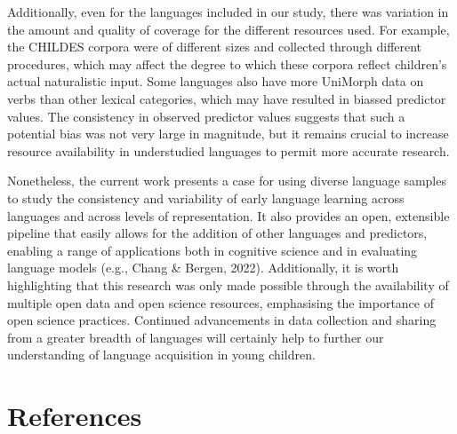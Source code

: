 \documentclass[10pt, letterpaper]{article}
\begin{document}
Additionally, even for the languages included in our study, there was
variation in the amount and quality of coverage for the different
resources used. For example, the CHILDES corpora were of different sizes
and collected through different procedures, which may affect the degree
to which these corpora reflect children's actual naturalistic input.
Some languages also have more UniMorph data on verbs than other lexical
categories, which may have resulted in biassed predictor values. The
consistency in observed predictor values suggests that such a potential
bias was not very large in magnitude, but it remains crucial to increase
resource availability in understudied languages to permit more accurate
research.

Nonetheless, the current work presents a case for using diverse language
samples to study the consistency and variability of early language
learning across languages and across levels of representation. It also
provides an open, extensible pipeline that easily allows for the
addition of other languages and predictors, enabling a range of
applications both in cognitive science and in evaluating language models
(e.g., Chang \& Bergen, 2022). Additionally, it is worth highlighting
that this research was only made possible through the availability of
multiple open data and open science resources, emphasising the
importance of open science practices. Continued advancements in data
collection and sharing from a greater breadth of languages will
certainly help to further our understanding of language acquisition in
young children.

\section{References}\label{references}

\setlength{\parindent}{-0.1in} 
\setlength{\leftskip}{0.125in}

\noindent
\end{document}

